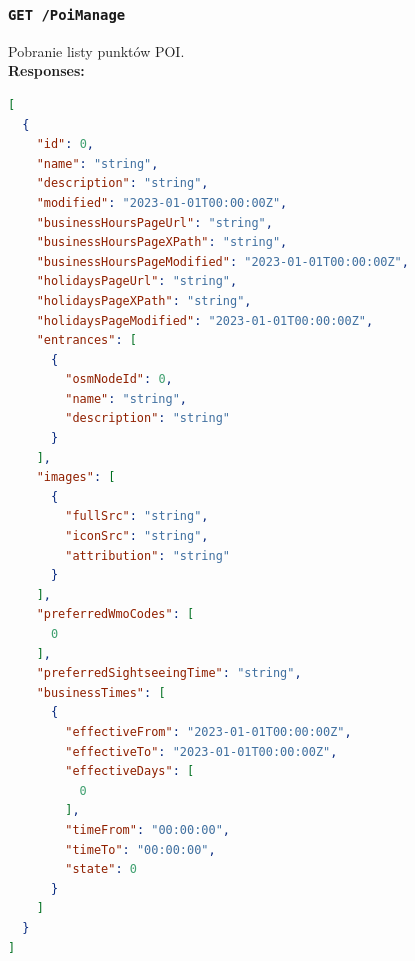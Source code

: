 \subsubsection{\lstinline[language=http]{GET /PoiManage}}
Pobranie listy punktów POI. \\
\textbf{Responses:}
\begin{lstlisting}[language=json]
[
  {
    "id": 0,
    "name": "string",
    "description": "string",
    "modified": "2023-01-01T00:00:00Z",
    "businessHoursPageUrl": "string",
    "businessHoursPageXPath": "string",
    "businessHoursPageModified": "2023-01-01T00:00:00Z",
    "holidaysPageUrl": "string",
    "holidaysPageXPath": "string",
    "holidaysPageModified": "2023-01-01T00:00:00Z",
    "entrances": [
      {
        "osmNodeId": 0,
        "name": "string",
        "description": "string"
      }
    ],
    "images": [
      {
        "fullSrc": "string",
        "iconSrc": "string",
        "attribution": "string"
      }
    ],
    "preferredWmoCodes": [
      0
    ],
    "preferredSightseeingTime": "string",
    "businessTimes": [
      {
        "effectiveFrom": "2023-01-01T00:00:00Z",
        "effectiveTo": "2023-01-01T00:00:00Z",
        "effectiveDays": [
          0
        ],
        "timeFrom": "00:00:00",
        "timeTo": "00:00:00",
        "state": 0
      }
    ]
  }
]
\end{lstlisting}

